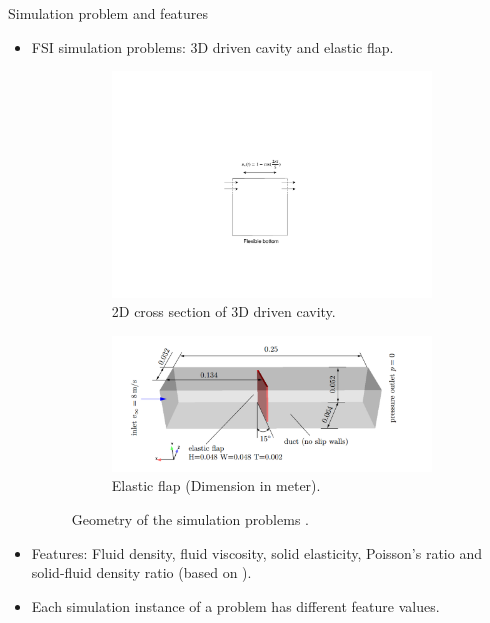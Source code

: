 \documentclass[10pt]{beamer}
\begin{document}
\begin{frame}[t]{Simulation problem and features}
\begin{itemize}
\item FSI simulation problems: 3D driven cavity and elastic flap.
\begin{figure}[!ht]
        \centering
        \begin{subfigure}{.45\textwidth}
          \centering
          \includegraphics[trim={6.5cm 5cm 5.3cm 7cm},clip,width=1.28\linewidth]{images/drivencavity.pdf}
          \caption{2D cross section of 3D driven cavity.}
    \end{subfigure}%
    \begin{subfigure}{.49\textwidth}
          \centering
          \includegraphics[width=1\linewidth, height=0.59\linewidth]{images/elasticflap_geometry.png}
          \caption{ Elastic flap (Dimension in meter).}
    \end{subfigure}
        \caption{Geometry of the simulation problems \cite{MpCCI_documentation}.}
        \label{Fig:simulation_problem}
    \end{figure}
\item Features: Fluid density, fluid viscosity, solid elasticity, Poisson's ratio and solid-fluid density ratio (based on \cite{FSI_properties} \cite{FSI_properties2}).
\newline
\item Each simulation instance of a problem has different feature values.
\end{itemize}
\end{frame}
\end{document}
